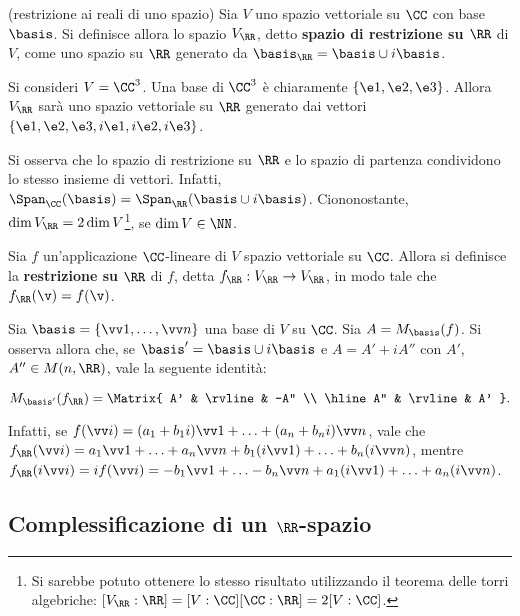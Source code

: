 \begin{definition} (restrizione ai reali di uno spazio) Sia $V$
	uno spazio vettoriale su $\CC$ con base $\basis$. Si definisce allora lo spazio $V_\RR$, detto
	\textbf{spazio di restrizione su $\RR$} di $V$, come uno spazio su $\RR$ generato da
	$\basis_\RR = \basis \cup i \basis$. 
\end{definition}

\begin{example}
	Si consideri $V = \CC^3$. Una base di $\CC^3$ è chiaramente $\{ \e1, \e2, \e3 \}$. Allora
	$V_\RR$ sarà uno spazio vettoriale su $\RR$ generato dai vettori $\{ \e1, \e2, \e3, i\e1, i\e2, i\e3 \}$.
\end{example}

\begin{remark}
	Si osserva che lo spazio di restrizione su $\RR$ e lo spazio di partenza condividono lo stesso insieme
	di vettori. Infatti, $\Span_\CC(\basis) = \Span_\RR(\basis \cup i\basis)$. Ciononostante, $\dim V_\RR = 2 \dim V$\footnote{Si sarebbe potuto ottenere lo stesso risultato utilizzando il teorema delle torri algebriche: $[V_\RR : \RR] = [V: \CC] [\CC: \RR] = 2 [V : \CC]$.}, se $\dim V \in \NN$.
\end{remark}

\begin{definition}
	Sia $f$ un'applicazione $\CC$-lineare di $V$ spazio vettoriale su $\CC$. Allora
	si definisce la \textbf{restrizione su} $\RR$ di $f$, detta $f_\RR : V_\RR \to V_\RR$,
	in modo tale che $f_\RR(\v) = f(\v)$.
\end{definition}

\begin{remark}
	Sia $\basis = \{\vv 1, \ldots, \vv n\}$ una base di $V$ su $\CC$. Sia $A = M_\basis(f)$. Si
	osserva allora che, se $\basis' = \basis \cup i \basis$ e $A = A' + i A''$ con $A'$, $A'' \in M(n, \RR)$,
	vale la seguente identità:
	
	\[ M_{\basis'}(f_\RR) = \Matrix{ A' & \rvline & -A'' \\ \hline A'' & \rvline & A' }. \]
	
	Infatti, se $f(\vv i) = (a_1 + b_1 i) \vv 1 + \ldots + (a_n + b_n i) \vv n$, vale che
	$f_\RR(\vv i) = a_1 \vv 1 + \ldots + a_n \vv n + b_1 (i \vv 1) + \ldots + b_n (i \vv n)$,
	mentre $f_\RR(i \vv i) = i f(\vv i) = - b_1 \vv 1 + \ldots - b_n \vv n + a_1 (i \vv 1) + \ldots + a_n (i \vv n)$.
\end{remark}

\subsection{Complessificazione di un $\RR$-spazio}

